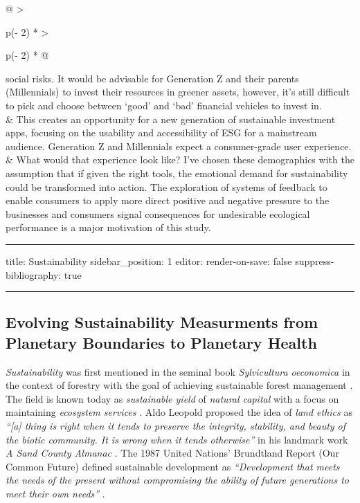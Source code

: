 \documentclass[
  letterpaper,
  DIV=11,
  numbers=noendperiod]{scrartcl}
\begin{document}
\begin{longtable}[]{@{}
  >{\raggedright\arraybackslash}p{(\columnwidth - 2\tabcolsep) * }
  >{\raggedright\arraybackslash}p{(\columnwidth - 2\tabcolsep) * }@{}}
social risks. It would be advisable for Generation Z and their parents
(Millennials) to invest their resources in greener assets, however, it's
still difficult to pick and choose between `good' and `bad' financial
vehicles to invest in. \\
& This creates an opportunity for a new generation of sustainable
investment apps, focusing on the usability and accessibility of ESG for
a mainstream audience. Generation Z and Millennials expect a
consumer-grade user experience. \\
& What would that experience look like? I've chosen these demographics
with the assumption that if given the right tools, the emotional demand
for sustainability could be transformed into action. The exploration of
systems of feedback to enable consumers to apply more direct positive
and negative pressure to the businesses and consumers signal
consequences for undesirable ecological performance is a major
motivation of this study. \\
\end{longtable}

\begin{center}\rule{0.5\linewidth}{0.5pt}\end{center}

title: Sustainability sidebar\_position: 1 editor: render-on-save: false
suppress-bibliography: true

\begin{center}\rule{0.5\linewidth}{0.5pt}\end{center}

\subsection{Evolving Sustainability Measurments from Planetary
Boundaries to Planetary
Health}\label{evolving-sustainability-measurments-from-planetary-boundaries-to-planetary-health}

\emph{Sustainability} was first mentioned in the seminal book
\emph{Sylvicultura oeconomica} in the context of forestry with the goal
of achieving sustainable forest management
\citep{hannsscarlvoncarlowitzSylviculturaOeconomicaOder1713}. The field
is known today as \emph{sustainable yield} of \emph{natural capital}
with a focus on maintaining \emph{ecosystem services}
\citep{peterkareivaNaturalCapitalTheory2011}. Aldo Leopold proposed the
idea of \emph{land ethics} as \emph{``{[}a{]} thing is right when it
tends to preserve the integrity, stability, and beauty of the biotic
community. It is wrong when it tends otherwise''} in his landmark work
\emph{A Sand County Almanac} \citep{leopoldSandCountyAlmanac1972}. The
1987 United Nations' Brundtland Report (Our Common Future) defined
sustainable development as \emph{``Development that meets the needs of
the present without compromising the ability of future generations to
meet their own needs''}
\citep{worldcommissiononenvironmentanddevelopmentOurCommonFuture1987}.
\end{document}
